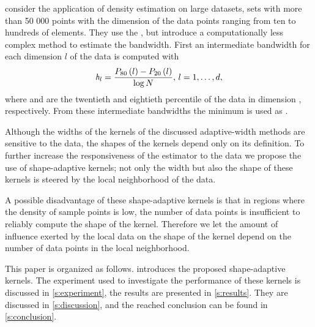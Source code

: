 	\textcite{ferdosi2011comparison} consider the application of density estimation on large datasets, \ie sets with more than 50 000 points with the dimension of the data points ranging from ten to hundreds of elements. They use the \mbe, but introduce a computationally less complex method to estimate the bandwidth. First an intermediate bandwidth for each dimension $l$ of the data is computed with		
	\begin{equation}\label{eq:1:ferdosiGeneralBandwidth}
			\mathit{h}_{l} = \frac{P_{80}\left( l \right) - P_{20}\left( l \right)}{\log N}, \, l = 1, \dotsc, d,
		\end{equation}
	where  and  are the twentieth and eightieth percentile of the data in dimension \itDim, respectively. From these intermediate bandwidths the minimum is used as \varBandwidth. 

	Although the widths of the kernels of the discussed adaptive-width methods are sensitive to the data, the shapes of the kernels depend only on its definition. To further increase the responsiveness of the estimator to the data we propose the use of shape-adaptive kernels; not only the width but also the shape of these kernels is steered by the local neighborhood of the data.

	A possible disadvantage of these shape-adaptive kernels is that in regions where the density of sample points is low, the number of data points is insufficient to reliably compute the shape of the kernel. Therefore we let the amount of influence exerted by the local data on the shape of the kernel depend on the number of data points in the local neighborhood.

	This paper is organized as follows.  introduces the proposed shape-adaptive kernels. The experiment used to investigate the performance of these kernels is discussed in \cref{s:experiment}, the results are presented in \cref{s:results}. They are discussed in \cref{s:discussion}, and the reached conclusion can be found in \cref{s:conclusion}.